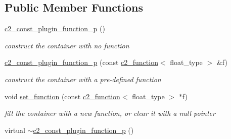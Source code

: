 \subsection*{Public Member Functions}
\begin{DoxyCompactItemize}
\item 
\hypertarget{classc2__const__plugin__function__p_a443dc7bcbdc6e458673b98aedf53ad56}{\hyperlink{classc2__const__plugin__function__p_a443dc7bcbdc6e458673b98aedf53ad56}{c2\-\_\-const\-\_\-plugin\-\_\-function\-\_\-p} ()}\label{classc2__const__plugin__function__p_a443dc7bcbdc6e458673b98aedf53ad56}

\begin{DoxyCompactList}\small\item\em construct the container with no function \end{DoxyCompactList}\item 
\hypertarget{classc2__const__plugin__function__p_a61e0b34f7740fc05a9290f25c0615214}{\hyperlink{classc2__const__plugin__function__p_a61e0b34f7740fc05a9290f25c0615214}{c2\-\_\-const\-\_\-plugin\-\_\-function\-\_\-p} (const \hyperlink{classc2__function}{c2\-\_\-function}$<$ float\-\_\-type $>$ \&f)}\label{classc2__const__plugin__function__p_a61e0b34f7740fc05a9290f25c0615214}

\begin{DoxyCompactList}\small\item\em construct the container with a pre-\/defined function \end{DoxyCompactList}\item 
\hypertarget{classc2__const__plugin__function__p_ab77027bb14278d0f9e49f661f784fdb5}{void \hyperlink{classc2__const__plugin__function__p_ab77027bb14278d0f9e49f661f784fdb5}{set\-\_\-function} (const \hyperlink{classc2__function}{c2\-\_\-function}$<$ float\-\_\-type $>$ $\ast$f)}\label{classc2__const__plugin__function__p_ab77027bb14278d0f9e49f661f784fdb5}

\begin{DoxyCompactList}\small\item\em fill the container with a new function, or clear it with a null pointer \end{DoxyCompactList}\item 
\hypertarget{classc2__const__plugin__function__p_a9b26b8f7469d38ff816b9a3d9b137745}{virtual \hyperlink{classc2__const__plugin__function__p_a9b26b8f7469d38ff816b9a3d9b137745}{$\sim$c2\-\_\-const\-\_\-plugin\-\_\-function\-\_\-p} ()}\label{classc2__const__plugin__function__p_a9b26b8f7469d38ff816b9a3d9b137745}


\end{DoxyCompactItemize}
